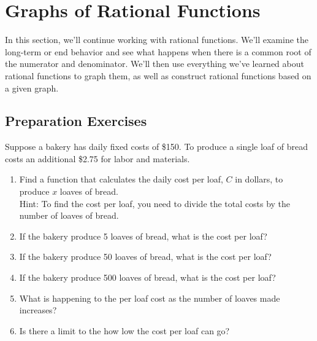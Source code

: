 
\section{Graphs of Rational Functions} \label{functions-rational-graphs}

In this section, we'll continue working with rational functions.  We'll examine the long-term or end behavior and see what happens when there is a common root of the numerator and denominator.  We'll then use everything we've learned about rational functions to graph them, as well as construct rational functions based on a given graph.
      \\[0.5em]



\subsection*{Preparation Exercises} \label{prep-functions-rational-graphs}


\begin{myPrep}
Suppose a bakery has daily fixed costs of \$150.  To produce a single loaf of bread costs an additional \$2.75  for labor and materials.
\begin{enumerate}
\item Find a function that calculates the daily cost per loaf, $C$ in dollars, to produce $x$ loaves of bread.  \\
Hint: To find the cost per loaf, you need to divide the total costs by the number of loaves of bread.
\vfill
\item If the bakery produce 5 loaves of bread, what is the cost per loaf?  
\vfill
\item If the bakery produce 50 loaves of bread, what is the cost per loaf?
\vfill
\item If the bakery produce 500 loaves of bread, what is the cost per loaf?
\vfill
\item What is happening to the per loaf cost as the number of loaves made increases?
\vfill
\item Is there a limit to the how low the cost per loaf can go?
\vfill
\end{enumerate}
\end{myPrep}
